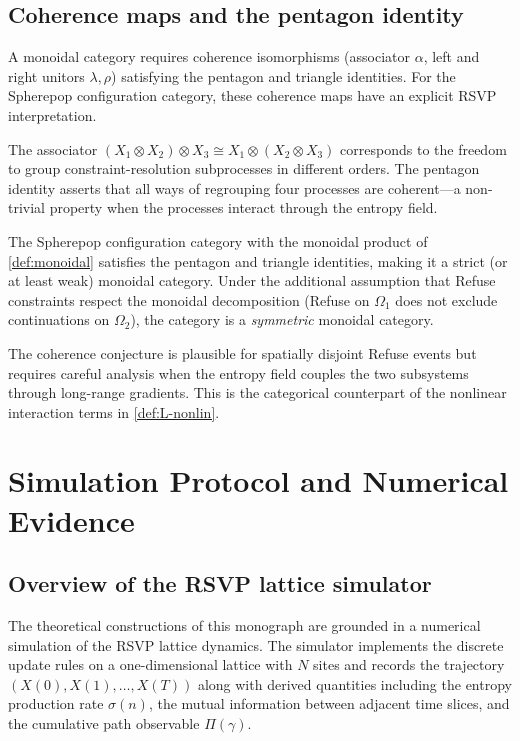 \documentclass[12pt, oneside]{memoir}
\begin{document}
\section{Coherence maps and the pentagon identity}

A monoidal category requires coherence isomorphisms (associator $\alpha$, left and right
unitors $\lambda, \rho$) satisfying the pentagon and triangle identities.  For the
Spherepop configuration category, these coherence maps have an explicit RSVP
interpretation.

The associator $(X_1 \otimes X_2) \otimes X_3 \cong X_1 \otimes (X_2 \otimes X_3)$
corresponds to the freedom to group constraint-resolution subprocesses in different
orders.  The pentagon identity asserts that all ways of regrouping four processes are
coherent---a non-trivial property when the processes interact through the entropy field.

\begin{conjecture}
\label{conj:coherence}
The Spherepop configuration category with the monoidal product of \cref{def:monoidal}
satisfies the pentagon and triangle identities, making it a strict (or at least weak)
monoidal category.  Under the additional assumption that Refuse constraints respect the
monoidal decomposition (Refuse on $\Omega_1$ does not exclude continuations on
$\Omega_2$), the category is a \emph{symmetric} monoidal category.
\end{conjecture}

The coherence conjecture is plausible for spatially disjoint Refuse events but requires
careful analysis when the entropy field couples the two subsystems through long-range
gradients.  This is the categorical counterpart of the nonlinear interaction terms in
\cref{def:L-nonlin}.

\chapter{Simulation Protocol and Numerical Evidence}
\label{ch:simulation}

\section{Overview of the RSVP lattice simulator}

The theoretical constructions of this monograph are grounded in a numerical simulation
of the RSVP lattice dynamics.  The simulator implements the discrete update rules
 on a one-dimensional lattice with $N$ sites and
records the trajectory $(X(0), X(1), \dots, X(T))$ along with derived quantities
including the entropy production rate $\sigma(n)$, the mutual information between
adjacent time slices, and the cumulative path observable $\Pi(\gamma)$.
\end{document}
